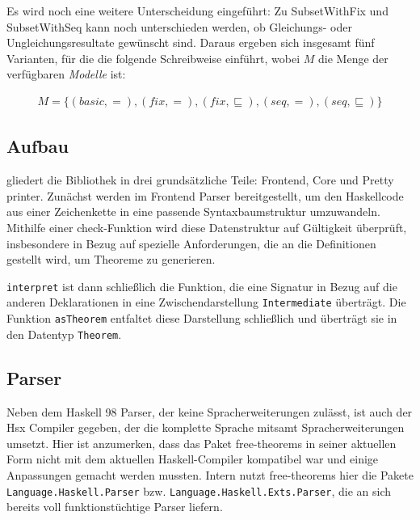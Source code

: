 \documentclass[11pt]{article} %
\begin{document}
Es wird noch eine weitere Unterscheidung eingeführt: Zu SubsetWithFix und SubsetWithSeq kann noch unterschieden werden,
ob Gleichungs- oder Ungleichungsresultate gewünscht sind. 
Daraus ergeben sich insgesamt fünf Varianten, für die \cite{freetheorems} die folgende Schreibweise einführt, wobei $M$ die Menge
der verfügbaren \textit{Modelle} ist:

\begin{align}
M = \{(basic, =), (fix, =), (fix, \sqsubseteq), (seq, =), (seq, \sqsubseteq)\}
\end{align}

\subsection{Aufbau}

\cite{freetheorems} gliedert die Bibliothek in drei grundsätzliche Teile:  Frontend, Core und Pretty printer. 
Zunächst werden im Frontend Parser bereitgestellt, um den Haskellcode aus einer Zeichenkette in eine passende Syntaxbaumstruktur umzuwandeln. Mithilfe einer check-Funktion
wird diese Datenstruktur auf Gültigkeit überprüft, insbesondere in Bezug auf spezielle Anforderungen, die an die Definitionen gestellt wird, um Theoreme zu generieren.

\texttt{interpret} ist dann schließlich die Funktion, die eine Signatur in Bezug auf die anderen Deklarationen in eine Zwischendarstellung \texttt{Intermediate} überträgt. Die
Funktion \texttt{asTheorem} entfaltet diese Darstellung  schließlich und überträgt sie in den Datentyp \texttt{Theorem}.

\subsection{Parser}

Neben dem Haskell 98 Parser, der keine  Spracherweiterungen zulässt, ist auch der Hsx Compiler gegeben, der die
komplette Sprache mitsamt Spracherweiterungen umsetzt. Hier ist anzumerken, dass das Paket free-theorems in seiner aktuellen Form
nicht mit dem aktuellen Haskell-Compiler kompatibel war und einige Anpassungen gemacht werden mussten. 
Intern nutzt free-theorems hier die Pakete \texttt{Language.Haskell.Parser} bzw. \texttt{Language.Haskell.Exts.Parser}, die an sich bereits voll funktionstüchtige Parser liefern.
\end{document}
